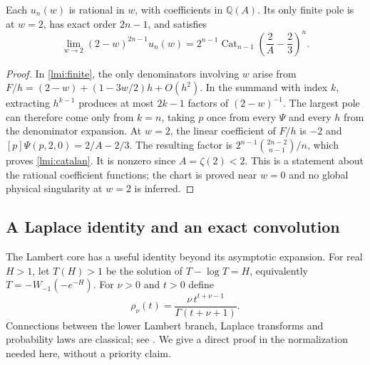 \begin{proposition}\label{lmi:poles}
Each $u_n(w)$ is rational in $w$, with coefficients in $\mathbb Q(A)$.
Its only finite pole is at $w=2$, has exact order $2n-1$, and satisfies
\begin{equation}\label{lmi:catalan}
 \lim_{w\to2}(2-w)^{2n-1}u_n(w)
 =2^{n-1}\operatorname{Cat}_{n-1}
       \left(\frac2A-\frac23\right)^n .
\end{equation}
\end{proposition}
\begin{proof}
In \eqref{lmi:finite}, the only denominators involving $w$ arise from
$F/h=(2-w)+(1-3w/2)h+O(h^2)$. In the summand with index $k$,
extracting $h^{k-1}$ produces at most $2k-1$ factors of $(2-w)^{-1}$.
The largest pole can therefore come only from $k=n$, taking $p$
once from every $\Psi$ and every $h$ from the denominator expansion.
At $w=2$, the linear coefficient of $F/h$ is $-2$ and
$[p]\Psi(p,2,0)=2/A-2/3$. The resulting factor is
$2^{n-1}\binom{2n-2}{n-1}/n$, which proves \eqref{lmi:catalan}.
It is nonzero since $A=\zeta(2)<2$. This is a statement about the
rational coefficient functions; the chart is proved near $w=0$ and
no global physical singularity at $w=2$ is inferred.
\end{proof}

\subsection{A Laplace identity and an exact convolution}
The Lambert core has a useful identity beyond its asymptotic expansion.
For real $H>1$, let $T(H)>1$ be the solution of
$T-\log T=H$, equivalently $T=-W_{-1}(-e^{-H})$.
For $\nu>0$ and $t>0$ define
\begin{equation}\label{lmi:density}
 \rho_\nu(t)=\frac{\nu\,t^{t+\nu-1}}{\Gamma(t+\nu+1)}.
\end{equation}
Connections between the lower Lambert branch, Laplace transforms and
probability laws are classical; see \cite{lmi:pakes}. We give a direct
proof in the normalization needed here, without a priority claim.

